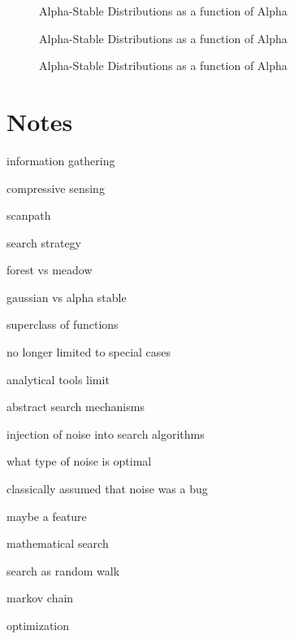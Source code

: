 \documentclass[8pt,journal,compsoc]{IEEEtran}
\begin{document}
\begin{figure}[h!]
\leavevmode      
\makebox{}     
\caption{Alpha-Stable Distributions as a function of Alpha}
\label{}
\end{figure}

\begin{figure}[h!]
\leavevmode      
\makebox{}     
\caption{Alpha-Stable Distributions as a function of Alpha}
\label{}
\end{figure}

\begin{figure}[h!]
\leavevmode     
\makebox{}     
\caption{Alpha-Stable Distributions as a function of Alpha}
\label{}
\end{figure}








\clearpage

\appendices
\section{Notes}





information gathering 

compressive sensing

scanpath

search strategy

forest vs meadow 

gaussian vs alpha stable

superclass of functions

no longer limited to special cases

analytical tools limit 

abstract search mechanisms

injection of noise into search algorithms

what type of noise is optimal

classically assumed that noise was a bug

maybe a feature 

mathematical search

search as random walk

markov chain 

optimization 
\end{document}
